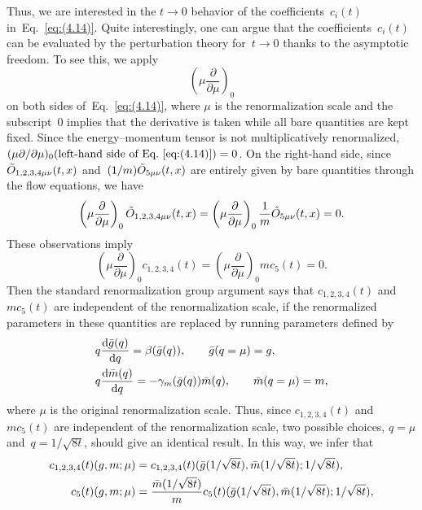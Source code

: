 Thus, we are interested in the $t\to0$ behavior of the coefficients~$c_i(t)$
in~Eq.~\eqref{eq:(4.14)}. Quite interestingly, one can argue that the
coefficients~$c_i(t)$ can be evaluated by the perturbation theory for~$t\to0$
thanks to the asymptotic freedom. To see this, we apply
\begin{equation}
   \left(\mu\frac{\partial}{\partial\mu}\right)_0
\label{eq:(4.17)}
\end{equation}
on both sides of~Eq.~\eqref{eq:(4.14)}, where $\mu$ is the renormalization
scale and the subscript~$0$ implies that the derivative is taken while all bare
quantities are kept fixed. Since the energy--momentum tensor is not
multiplicatively renormalized,
$(\mu\partial/\partial\mu)_0(\text{left-hand side of Eq.~\eqref{eq:(4.14)}})=0$.
On the right-hand side, since $\Tilde{O}_{1,2,3,4\mu\nu}(t,x)$
and~$(1/m)\Tilde{O}_{5\mu\nu}(t,x)$ are entirely given by bare quantities
through the flow equations, we have
\begin{equation}
   \left(\mu\frac{\partial}{\partial\mu}\right)_0\Tilde{O}_{1,2,3,4\mu\nu}(t,x)
   =\left(\mu\frac{\partial}{\partial\mu}\right)_0
   \frac{1}{m}\Tilde{O}_{5\mu\nu}(t,x)
   =0.
\label{eq:(4.18)}
\end{equation}
These observations imply
\begin{equation}
   \left(\mu\frac{\partial}{\partial\mu}\right)_0c_{1,2,3,4}(t)
   =\left(\mu\frac{\partial}{\partial\mu}\right)_0mc_5(t)
   =0.
\label{eq:(4.19)}
\end{equation}
Then the standard renormalization group argument says that $c_{1,2,3,4}(t)$
and~$mc_5(t)$ are independent of the renormalization scale, if the renormalized
parameters in these quantities are replaced by running parameters defined by
\begin{align}
   &q\frac{\mathrm{d}\Bar{g}(q)}{\mathrm{d}q}=\beta(\Bar{g}(q)),\qquad
   \Bar{g}(q=\mu)=g,
\label{eq:(4.20)}\\
   &q\frac{\mathrm{d}\Bar{m}(q)}{\mathrm{d}q}=-\gamma_m(\Bar{g}(q))\Bar{m}(q),\qquad
   \Bar{m}(q=\mu)=m,
\label{eq:(4.21)}
\end{align}
where $\mu$ is the original renormalization scale. Thus, since $c_{1,2,3,4}(t)$
and~$mc_5(t)$ are independent of the renormalization scale, two possible
choices, $q=\mu$ and~$q=1/\sqrt{8t}$, should give an identical result. In this
way, we infer that
\begin{align}
   c_{1,2,3,4}(t)(g,m;\mu)
   &=c_{1,2,3,4}(t)(\Bar{g}(1/\sqrt{8t}),\Bar{m}(1/\sqrt{8t});1/\sqrt{8t}),
\label{eq:(4.22)}\\
   c_5(t)(g,m;\mu)
   &=\frac{\Bar{m}(1/\sqrt{8t})}{m}
   c_5(t)(\Bar{g}(1/\sqrt{8t}),\Bar{m}(1/\sqrt{8t});1/\sqrt{8t}),
\label{eq:(4.23)}
\end{align}
